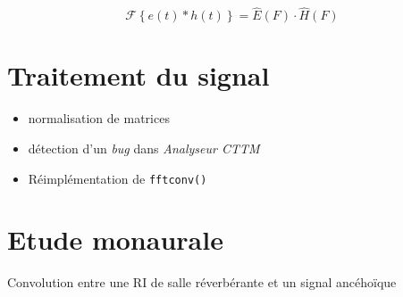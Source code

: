 \documentclass{beamer}
\begin{document}
\begin{frame}

\begin{figure}
\end{figure}

\begin{equation*}
\mathcal{F}\left\{e(t) \ast h(t)\right\} = \hat{E}(F) \cdot \hat{H}(F)
\end{equation*}
\end{frame}


\section{Traitement du signal}

\begin{frame}
\begin{itemize}
    \item normalisation de matrices
    \item détection d'un \textit{bug} dans \textit{Analyseur CTTM}
    \item Réimplémentation de \texttt{fftconv()}
\end{itemize}
\end{frame}

\section{Etude monaurale}

\begin{frame}
\begin{figure}
\end{figure}
\begin{center}
Convolution entre une RI de salle réverbérante et un signal ancéhoïque
\end{center}
\end{frame}
\end{document}
